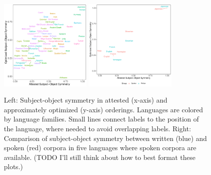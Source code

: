 \documentclass[11pt,a4paper]{article}
\newcommand\comment[1]{{\color{red}#1}}
\newcommand\mhahn[1]{{\color{red}(#1)}}
\begin{document}



\begin{figure}
    \centering
    \includegraphics[width=0.4\textwidth]{../analysis/figures/fracion-optimized_DLM_2.6_format.pdf}
    \includegraphics[width=0.4\textwidth]{../analysis/analysis_spoken/spoken.pdf}
    \caption{Left: Subject-object symmetry in attested (x-axis) and approximately optimized (y-axis) orderings. Languages are colored by language families. Small lines connect labels to the position of the language, where needed to avoid overlapping labels. Right: Comparison of subject-object symmetry between written (blue) and spoken (red) corpora in five languages where spoken corpora are available. \mhahn{TODO I'll still think about how to best format these plots.}}
    \label{fig:study1}\label{fig:spoken}
\end{figure}


\end{document}
